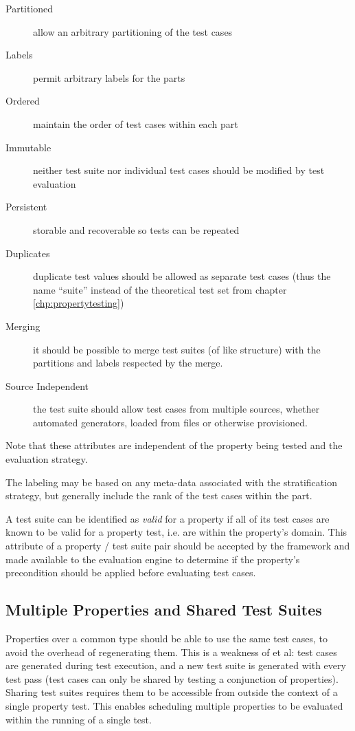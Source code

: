 \begin{description}
\item[Partitioned] allow an arbitrary partitioning of the test cases
\item[Labels] permit arbitrary labels for the parts
\item[Ordered] maintain the order of test cases within each part
\item[Immutable] neither test suite nor individual test cases should be modified by test evaluation
\item[Persistent] storable and recoverable so tests can be repeated
\item[Duplicates] duplicate test values should be allowed as separate test cases
(thus the name ``suite'' instead of the theoretical test set from chapter \ref{chp:propertytesting})
\item[Merging] it should be possible to merge test suites (of like structure)
with the partitions and labels respected by the merge.
\item[Source Independent] the test suite should allow test cases from multiple sources,
whether automated generators, loaded from files or otherwise provisioned.
\end{description}
\noindent
Note that 
these attributes are independent of the property being tested and the evaluation strategy.

The labeling may be based on 
any meta-data associated with the stratification strategy,
but generally include the rank of the test cases within the part.

A test suite can be identified as \emph{valid} for a property if 
all of its test cases are known to be valid for a property test,
i.e. are within the property's domain.
This attribute of a property / test suite pair 
should be accepted by the framework and made available to the evaluation engine
to determine if the property's precondition should be applied before evaluating test cases.

\subsection{Multiple Properties and Shared Test Suites}

Properties over a common type
should be able to use the same test cases, to avoid the overhead of regenerating them.
This is a weakness of \QC et al:
test cases are generated during test execution, and
a new test suite is generated with every test pass
(test cases can only be shared by testing a conjunction of properties).
Sharing test suites requires them to be accessible from outside the context of
a single property test.  This enables scheduling multiple properties to be
evaluated within the running of a single test.

